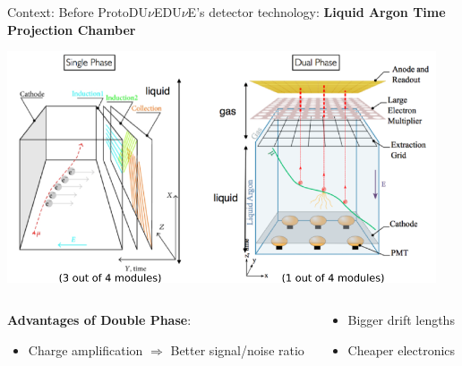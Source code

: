 \documentclass[10pt]{beamer}
\begin{document}
    \begin{frame}{Context: Before \texorpdfstring{ProtoDU$\nu$E}{ProtoDUNE}}{DU$\nu$E's detector technology: \textbf{Liquid Argon Time Projection Chamber}}
    	\begin{scriptsize}
    			\includegraphics[width=0.95\textwidth]{figures/contexte/lar-dlartpc.png}\\\vfill
    			\begin{columns}
    				\begin{column}{0.48\textwidth}
    					\textbf{Advantages of Double Phase}:
    					\begin{itemize}
    						\item Charge amplification $\Rightarrow$ Better signal/noise ratio
    					\end{itemize}
    				\end{column}\hfill
    				\begin{column}{0.48\textwidth}
    					\begin{itemize}
    						\item Bigger drift lengths
    						\item Cheaper electronics
    					\end{itemize}
    				\end{column}
    			\end{columns}

\end{scriptsize}
\end{frame}
\end{document}
